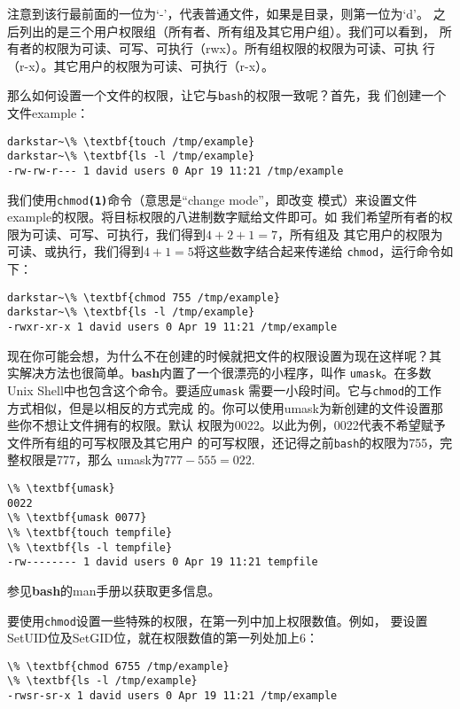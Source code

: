注意到该行最前面的一位为`-'，代表普通文件，如果是目录，则第一位为`d'。
之后列出的是三个用户权限组（所有者、所有组及其它用户组）。我们可以看到，
所有者的权限为可读、可写、可执行（rwx）。所有组权限的权限为可读、可执
行（r-x）。其它用户的权限为可读、可执行（r-x）。

那么如何设置一个文件的权限，让它与\texttt{bash}的权限一致呢？首先，我
们创建一个文件example：
\begin{Verbatim}[frame=single, commandchars=\\\{\}]
darkstar~\% \textbf{touch /tmp/example}
darkstar~\% \textbf{ls -l /tmp/example}
-rw-rw-r--- 1 david users 0 Apr 19 11:21 /tmp/example 
\end{Verbatim}
我们使用\texttt{chmod\textbf{(1)}}命令（意思是``change mode''，即改变
模式）来设置文件example的权限。将目标权限的八进制数字赋给文件即可。如
我们希望所有者的权限为可读、可写、可执行，我们得到$4+2+1=7$，所有组及
其它用户的权限为可读、或执行，我们得到$4+1=5$将这些数字结合起来传递给
\texttt{chmod}，运行命令如下：
\begin{Verbatim}[frame=single, commandchars=\\\{\}]
darkstar~\% \textbf{chmod 755 /tmp/example}
darkstar~\% \textbf{ls -l /tmp/example}
-rwxr-xr-x 1 david users 0 Apr 19 11:21 /tmp/example 
\end{Verbatim}

现在你可能会想，为什么不在创建的时候就把文件的权限设置为现在这样呢？其
实解决方法也很简单。\textbf{bash}内置了一个很漂亮的小程序，叫作
\texttt{umask}。在多数Unix Shell中也包含这个命令。要适应\texttt{umask}
需要一小段时间。它与\texttt{chmod}的工作方式相似，但是以相反的方式完成
的。你可以使用umask为新创建的文件设置那些你不想让文件拥有的权限。默认
权限为0022。以此为例，0022代表不希望赋予文件所有组的可写权限及其它用户
的可写权限，还记得之前\texttt{bash}的权限为755，完整权限是777，那么
umask为$777-555=022$.

\begin{Verbatim}[frame=single, commandchars=\\\{\}]
\% \textbf{umask}
0022
\% \textbf{umask 0077}
\% \textbf{touch tempfile}
\% \textbf{ls -l tempfile}
-rw-------- 1 david users 0 Apr 19 11:21 tempfile
\end{Verbatim}
参见\textbf{bash}的man手册以获取更多信息。

要使用\texttt{chmod}设置一些特殊的权限，在第一列中加上权限数值。例如，
要设置SetUID位及SetGID位，就在权限数值的第一列处加上6：
\begin{Verbatim}[frame=single, commandchars=\\\{\}]
\% \textbf{chmod 6755 /tmp/example}
\% \textbf{ls -l /tmp/example}
-rwsr-sr-x 1 david users 0 Apr 19 11:21 /tmp/example
\end{Verbatim}

